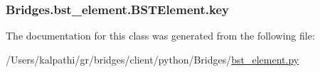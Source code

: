 \subsubsection[{key}]{\setlength{\rightskip}{0pt plus 5cm}Bridges.\+bst\+\_\+element.\+B\+S\+T\+Element.\+key}\label{class_bridges_1_1bst__element_1_1_b_s_t_element_a1b04a3676ac84d889491f8a496aedb91}


The documentation for this class was generated from the following file\+:\begin{DoxyCompactItemize}
\item 
/\+Users/kalpathi/gr/bridges/client/python/\+Bridges/\hyperlink{bst__element_8py}{bst\+\_\+element.\+py}\end{DoxyCompactItemize}
